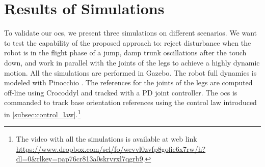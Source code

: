 \documentclass[letterpaper, 10 pt, conference]{ieeeconf}  %
\begin{document}
\section{Results of Simulations}
\label{sec:simulations}
To validate our \gls{ocs}, we present three simulations on different scenarios. We want to test the capability of the proposed approach to: 
reject disturbance when the robot is in the flight phase of a jump, damp trunk oscillations after the touch down, 
and work in parallel with the joints of the legs to achieve a highly dynamic motion. 
All the simulations are performed in Gazebo. The robot full dynamics is modeled with Pinocchio \cite{carpentier2019pinocchio}. The references for the joints of the legs are computed off-line using Crocoddyl \cite{mastalli2020crocoddyl} and tracked with a PD joint controller. The \gls{ocs} is commanded to 
track base orientation references using the control law introduced in \ref{subsec:control_law}.\footnote{The video with all the simulations is available at web link \url{https://www.dropbox.com/scl/fo/wevvl0zvfp8gofie6x7rw/h?dl=0&rlkey=pap76cr813a0skrvrxl7qgrb9}.}
\end{document}
